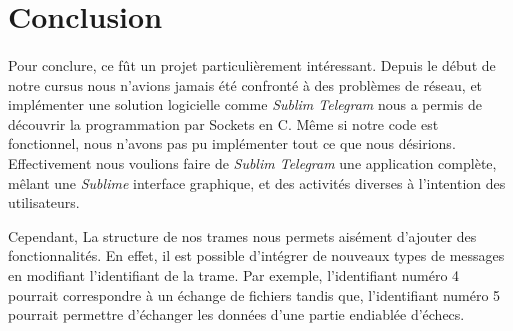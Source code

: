 \documentclass[a4paper, 12pt]{article}
\begin{document}
\section{Conclusion}
\paragraph{}
Pour conclure, ce fût un projet particulièrement intéressant. Depuis le début de notre cursus nous n'avions jamais été confronté à des problèmes de réseau, et implémenter une solution logicielle comme \emph{Sublim Telegram} nous a permis de découvrir la programmation par Sockets en C. 
Même si notre code est fonctionnel, nous n'avons pas pu implémenter tout ce que nous désirions. Effectivement nous voulions faire de \emph{Sublim Telegram} une application complète, mêlant une \emph{Sublime} interface graphique, et des activités diverses à l'intention des utilisateurs. 

Cependant, La structure de nos trames nous permets aisément d'ajouter des fonctionnalités. En effet, il est possible d’intégrer de nouveaux types de messages en modifiant l'identifiant de la trame.
Par exemple, l'identifiant numéro 4 pourrait correspondre à un échange de fichiers tandis que, l'identifiant numéro 5 pourrait permettre d’échanger les données d'une partie endiablée d’échecs.
\end{document}
